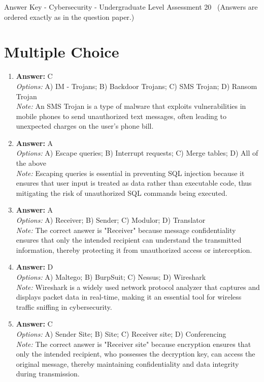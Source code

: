 \documentclass[12pt]{article}
\begin{document}
\begin{center}
Answer Key - Cybersecurity - Undergraduate Level Assessment 20 \
\small (Answers are ordered exactly as in the question paper.)
\end{center}

\section*{Multiple Choice}
\begin{enumerate}[label=\arabic*.]
\item \textbf{Answer:} C
\\ \textit{Options:} A) IM - Trojans; B) Backdoor Trojans; C) SMS Trojan; D) Ransom Trojan
\\ \textit{Note:} An SMS Trojan is a type of malware that exploits vulnerabilities in mobile phones to send unauthorized text messages, often leading to unexpected charges on the user's phone bill.
\item \textbf{Answer:} A
\\ \textit{Options:} A) Escape queries; B) Interrupt requests; C) Merge tables; D) All of the above
\\ \textit{Note:} Escaping queries is essential in preventing SQL injection because it ensures that user input is treated as data rather than executable code, thus mitigating the risk of unauthorized SQL commands being executed.
\item \textbf{Answer:} A
\\ \textit{Options:} A) Receiver; B) Sender; C) Modulor; D) Translator
\\ \textit{Note:} The correct answer is "Receiver" because message confidentiality ensures that only the intended recipient can understand the transmitted information, thereby protecting it from unauthorized access or interception.
\item \textbf{Answer:} D
\\ \textit{Options:} A) Maltego; B) BurpSuit; C) Nessus; D) Wireshark
\\ \textit{Note:} Wireshark is a widely used network protocol analyzer that captures and displays packet data in real-time, making it an essential tool for wireless traffic sniffing in cybersecurity.
\item \textbf{Answer:} C
\\ \textit{Options:} A) Sender Site; B) Site; C) Receiver site; D) Conferencing
\\ \textit{Note:} The correct answer is "Receiver site" because encryption ensures that only the intended recipient, who possesses the decryption key, can access the original message, thereby maintaining confidentiality and data integrity during transmission.
\end{enumerate}
\end{document}
